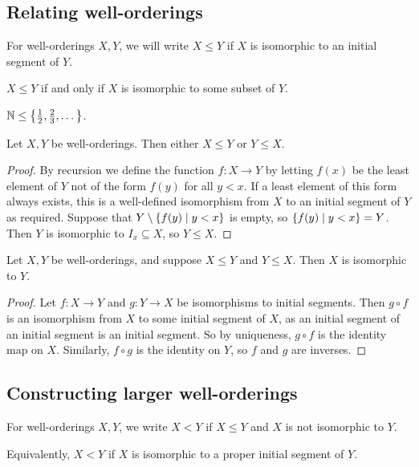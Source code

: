 \subsection{Relating well-orderings}
\begin{definition}
    For well-orderings \( X, Y \), we will write \( X \leq Y \) if \( X \) is isomorphic to an initial segment of \( Y \).
\end{definition}
\( X \leq Y \) if and only if \( X \) is isomorphic to some subset of \( Y \).
\begin{example}
    \( \mathbb N \leq \qty{\frac{1}{2}, \frac{2}{3}, \dots} \).
\end{example}
\begin{proposition}
    Let \( X, Y \) be well-orderings.
    Then either \( X \leq Y \) or \( Y \leq X \).
\end{proposition}
\begin{proof}
    By recursion we define the function \( f \colon X \to Y \) by letting \( f(x) \) be the least element of \( Y \) not of the form \( f(y) \) for all \( y < x \).
    If a least element of this form always exists, this is a well-defined isomorphism from \( X \) to an initial segment of \( Y \) as required.
    Suppose that \( Y \setminus \qty{f(y) \mid y < x} \) is empty, so \( \qty{f(y) \mid y < x} = Y \).
    Then \( Y \) is isomorphic to \( I_x \subseteq X \), so \( Y \leq X \).
\end{proof}
\begin{proposition}
    Let \( X, Y \) be well-orderings, and suppose \( X \leq Y \) and \( Y \leq X \).
    Then \( X \) is isomorphic to \( Y \).
\end{proposition}
\begin{proof}
    Let \( f \colon X \to Y \) and \( g \colon Y \to X \) be isomorphisms to initial segments.
    Then \( g \circ f \) is an isomorphism from \( X \) to some initial segment of \( X \), as an initial segment of an initial segment is an initial segment.
    So by uniqueness, \( g \circ f \) is the identity map on \( X \).
    Similarly, \( f \circ g \) is the identity on \( Y \), so \( f \) and \( g \) are inverses.
\end{proof}

\subsection{Constructing larger well-orderings}
\begin{definition}
    For well-orderings \( X, Y \), we write \( X < Y \) if \( X \leq Y \) and \( X \) is not isomorphic to \( Y \).
\end{definition}
Equivalently, \( X < Y \) if \( X \) is isomorphic to a proper initial segment of \( Y \).


